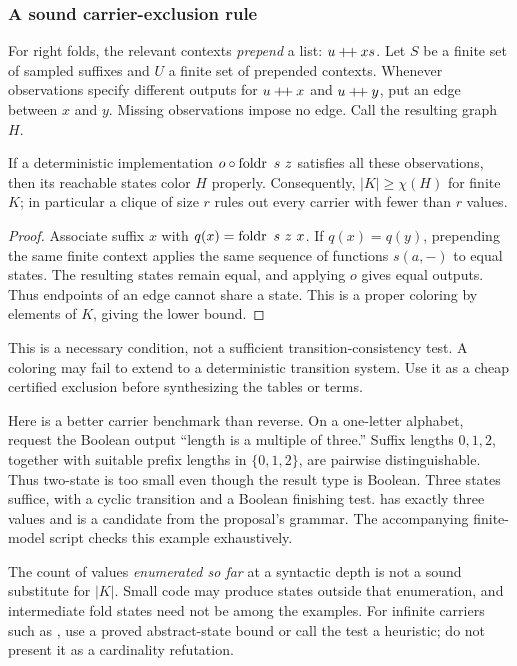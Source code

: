 \subsubsection*{A sound carrier-exclusion rule}

For right folds, the relevant contexts \emph{prepend} a list: $u\mathbin{+\!+} xs$. Let $S$ be a finite set of sampled suffixes and $U$ a finite set of prepended contexts. Whenever observations specify different outputs for $u\mathbin{+\!+} x$ and $u\mathbin{+\!+} y$, put an edge between $x$ and $y$. Missing observations impose no edge. Call the resulting graph $H$.

\begin{theorem}
If a deterministic implementation $o\circ\operatorname{foldr}\ s\ z$ satisfies all these observations, then its reachable states color $H$ properly. Consequently, $|K|\geq\chi(H)$ for finite $K$; in particular a clique of size $r$ rules out every carrier with fewer than $r$ values.
\end{theorem}
\begin{proof}
Associate suffix $x$ with $q(x)=\operatorname{foldr}\ s\ z\ x$. If $q(x)=q(y)$, prepending the same finite context applies the same sequence of functions $s(a,-)$ to equal states. The resulting states remain equal, and applying $o$ gives equal outputs. Thus endpoints of an edge cannot share a state. This is a proper coloring by elements of $K$, giving the lower bound.
\end{proof}

This is a necessary condition, not a sufficient transition-consistency test. A coloring may fail to extend to a deterministic transition system. Use it as a cheap certified exclusion before synthesizing the tables or terms.

Here is a better carrier benchmark than reverse. On a one-letter alphabet, request the Boolean output ``length is a multiple of three.'' Suffix lengths $0,1,2$, together with suitable prefix lengths in $\{0,1,2\}$, are pairwise distinguishable. Thus two-state  is too small even though the result type is Boolean. Three states suffice, with a cyclic transition and a Boolean finishing test.  has exactly three values and is a candidate from the proposal's grammar. The accompanying finite-model script checks this example exhaustively.

The count of values \emph{enumerated so far} at a syntactic depth is not a sound substitute for $|K|$. Small code may produce states outside that enumeration, and intermediate fold states need not be among the examples. For infinite carriers such as , use a proved abstract-state bound or call the test a heuristic; do not present it as a cardinality refutation.

